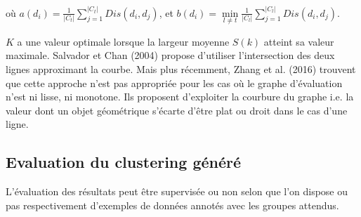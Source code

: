 où $a(d_i) = \frac{1}{\vert C_t \vert} \sum\limits_{j=1}^{\vert C_t \vert} Dis(d_i, d_j)$, et $b(d_i) = \min\limits_{l \neq t} \frac{1}{\vert C_l \vert} \sum\limits_{j=1}^{\vert C_l \vert} Dis(d_i, d_j)$.

$K$ a une valeur optimale lorsque la largeur moyenne $S(k)$ atteint sa valeur maximale. Salvador et Chan (2004) propose d’utiliser l’intersection des deux lignes approximant la courbe. Mais plus récemment, Zhang et al. (2016) trouvent que cette approche n’est pas appropriée pour les cas où le graphe d’évaluation n’est ni lisse, ni monotone. Ils proposent d’exploiter la courbure du graphe i.e. la valeur dont un objet géométrique s'écarte d'être plat ou droit dans le cas d'une ligne.







\subsection{Evaluation du clustering généré}
L'évaluation des résultats peut être supervisée ou non selon que l'on dispose ou pas respectivement d'exemples de données annotés avec les groupes attendus.

